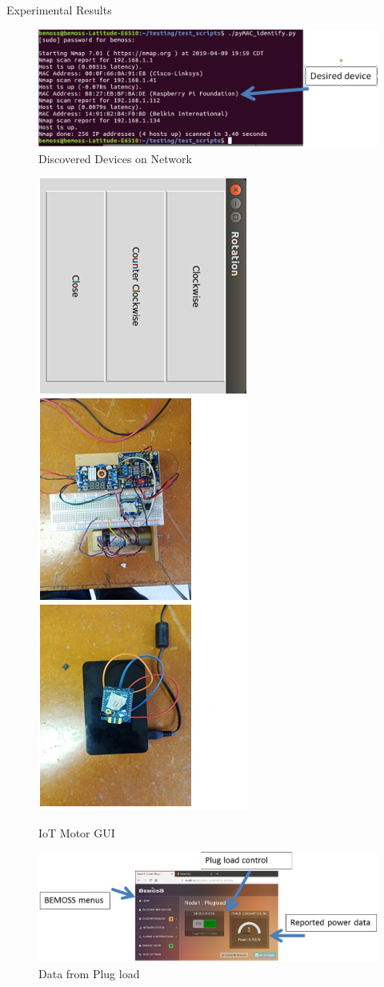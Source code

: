 \documentclass[final]{beamer}
\newlength{\onecolwid}
\begin{document}
\begin{frame}[t]
\begin{columns}[t]
\begin{column}{\onecolwid}
\begin{block}{Experimental Results}
\begin{figure}
    \centering
    \includegraphics[width=.75\textwidth,keepaspectratio=true]{figs/img/Identify.png}
    \caption{Discovered Devices on Network}
    \label{fig:my_label}
\end{figure}
\begin{figure}
    \centering
    \includegraphics[width=.25\textwidth,keepaspectratio=true, angle=-270]{figs/img/three.png}
    \label{fig:my_label}
        \caption{IoT Motor GUI}
\end{figure}

\begin{figure}
    \centering
    \includegraphics[width=.99\textwidth,keepaspectratio=true]{figs/img/PlugloadData-Arrows.png}
    \caption{Data from Plug load}
   \label{fig:MotorCircuit}


\end{figure}
\end{block}
\end{column}
\end{columns}
\end{frame}
\end{document}
